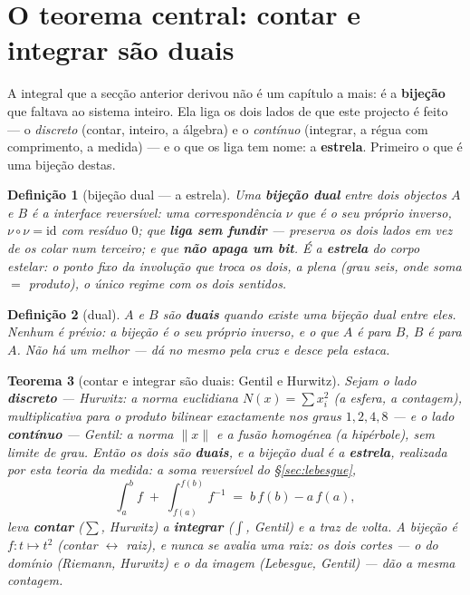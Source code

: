 \documentclass[11pt,a4paper]{article}
\newtheorem{teorema}{Teorema}
\newtheorem{definicao}[teorema]{Definição}
\begin{document}
\section{O teorema central: contar e integrar são duais}\label{sec:central}

A integral que a secção anterior derivou não é um capítulo a mais: é a \textbf{bijeção} que faltava ao
sistema inteiro. Ela liga os dois lados de que este projecto é feito --- o \emph{discreto} (contar,
inteiro, a álgebra) e o \emph{contínuo} (integrar, a régua com comprimento, a medida) --- e o que os
liga tem nome: a \textbf{estrela}. Primeiro o que é uma bijeção destas.

\begin{definicao}[bijeção dual --- a estrela]\label{def:bijdual}
Uma \textbf{bijeção dual} entre dois objectos $A$ e $B$ é a \emph{interface reversível}: uma
correspondência $\nu$ que é o seu próprio inverso, $\nu\circ\nu=\mathrm{id}$ com resíduo $0$; que
\textbf{liga sem fundir} --- preserva os dois lados em vez de os colar num terceiro; e que \textbf{não
apaga um bit}. É a \textbf{estrela} do corpo estelar: o ponto fixo da involução que troca os dois, a
plena (grau seis, onde soma $=$ produto), o único regime com os dois sentidos.
\end{definicao}

\begin{definicao}[dual]\label{def:dualmed}
$A$ e $B$ são \textbf{duais} quando existe uma bijeção dual entre eles. Nenhum é prévio: a bijeção é o
seu próprio inverso, e o que $A$ é para $B$, $B$ é para $A$. \emph{Não há um melhor} --- dá no mesmo
pela cruz e desce pela estaca.
\end{definicao}

\begin{teorema}[contar e integrar são duais: Gentil e Hurwitz]\label{thm:central}
Sejam o lado \textbf{discreto} --- \emph{Hurwitz}: a norma euclidiana $N(x)=\sum x_i^2$ (a esfera, a
contagem), multiplicativa para o produto \emph{bilinear} exactamente nos graus $1,2,4,8$ --- e o lado
\textbf{contínuo} --- \emph{Gentil}: a norma $\|x\|$ e a fusão homogénea (a hipérbole), sem limite de
grau. Então os dois são \textbf{duais}, e a bijeção dual é a \textbf{estrela}, realizada por esta
teoria da medida: a soma reversível do \S\ref{sec:lebesgue},
\[
  \int_a^b f \;+\; \int_{f(a)}^{f(b)} f^{-1} \;=\; b\,f(b)-a\,f(a),
\]
leva \textbf{contar} ($\sum$, Hurwitz) a \textbf{integrar} ($\int$, Gentil) e a traz de volta. A
bijeção é $f:t\mapsto t^2$ (contar $\leftrightarrow$ raiz), e \emph{nunca se avalia uma raiz}: os dois
cortes --- o do domínio (Riemann, Hurwitz) e o da imagem (Lebesgue, Gentil) --- dão a mesma contagem.
\end{teorema}
\end{document}
